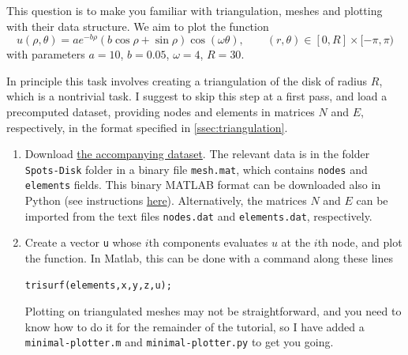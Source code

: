 \documentclass[a4paper]{siamonline220329}
\theoremstyle{plain}
\begin{document}
\begin{question}
  This question is to make you familiar with triangulation, meshes and plotting
  with their data structure. We aim to plot the function
  \[
    u(\rho,\theta) = a e^{-b \rho}(b\cos \rho  + \sin \rho ) \cos(\omega \theta),
    \qquad (r,\theta) \in [0,R] \times [-\pi,\pi)
  \]
  with parameters $a =10$, $b = 0.05$, $\omega =4$, $R = 30$. 

  In principle this task involves creating a triangulation of the disk of radius $R$,
  which is a nontrivial task. I suggest to skip this step at a first pass, and
  load a precomputed dataset, providing nodes and elements in matrices $N$ and
  $E$, respectively, in the format specified in \cref{ssec:triangulation}.

  \begin{enumerate}
    \item Download \href{https://zenodo.org/records/11120604}{the accompanying
  dataset}. The relevant data is in the folder \lstinline|Spots-Disk| folder
      in a binary file \texttt{mesh.mat}, which contains \texttt{nodes} and \texttt{elements} fields.
      This binary MATLAB format can be downloaded also in Python (see instructions
      \href{https://docs.scipy.org/doc/scipy/reference/generated/scipy.io.loadmat.html}{here}).
      Alternatively, the matrices $N$ and $E$ can be imported from the text files
      \texttt{nodes.dat} and \texttt{elements.dat}, respectively.
    \item Create a vector \texttt{u} whose $i$th components evaluates $u$ at the
      $i$th node, and plot the function. In Matlab, this can be done with a command
      along these lines
      \begin{lstlisting}[numbers=none]
trisurf(elements,x,y,z,u);
      \end{lstlisting}
      Plotting on triangulated meshes may not be straightforward, and you need to
      know how to do it for the remainder of the tutorial, so I have added a
      \lstinline|minimal-plotter.m| and \lstinline|minimal-plotter.py| to get you
      going. 
  \end{enumerate}
\end{question}
\end{document}
